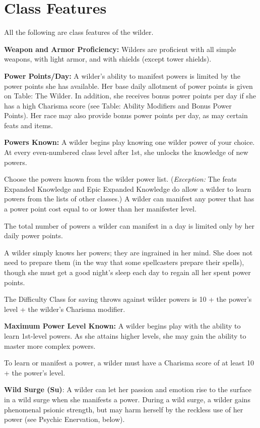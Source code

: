 \documentclass{article}
\begin{document}
\vspace{12pt}
\section*{\textbf{Class Features}}

All the following are class features of the wilder.

\textbf{Weapon and Armor Proficiency: }Wilders are proficient with all simple weapons, 
with light armor, and with shields (except tower shields).

\textbf{Power Points/Day:} A wilder's ability to manifest powers is limited by 
the power points she has available. Her base daily allotment of power points is 
given on Table: The Wilder. In addition, she receives bonus power points per day 
if she has a high Charisma score (see Table: Ability Modifiers and Bonus Power 
Points). Her race may also provide bonus power points per day, as may certain feats 
and items.

\textbf{Powers Known:} A wilder begins play knowing one wilder power of your choice. 
At every even-numbered class level after 1st, she unlocks the knowledge of new 
powers.

Choose the powers known from the wilder power list. (\textit{Exception: }The feats 
Expanded Knowledge and Epic Expanded Knowledge do allow a wilder to learn powers 
from the lists of other classes.) A wilder can manifest any power that has a power 
point cost equal to or lower than her manifester level.

The total number of powers a wilder can manifest in a day is limited only by her 
daily power points.

A wilder simply knows her powers; they are ingrained in her mind. She does not 
need to prepare them (in the way that some spellcasters prepare their spells), 
though she must get a good night's sleep each day to regain all her spent power 
points.

The Difficulty Class for saving throws against wilder powers is 10 + the power's 
level + the wilder's Charisma modifier.

\textbf{Maximum Power Level Known:} A wilder begins play with the ability to learn 
1st-level powers. As she attains higher levels, she may gain the ability to master 
more complex powers.

To learn or manifest a power, a wilder must have a Charisma score of at least 10 
+ the power's level.

\textbf{Wild Surge (Su)}: A wilder can let her passion and emotion rise to the 
surface in a wild surge when she manifests a power. During a wild surge, a wilder 
gains phenomenal psionic strength, but may harm herself by the reckless use of 
her power (see Psychic Enervation, below). 
\end{document}
